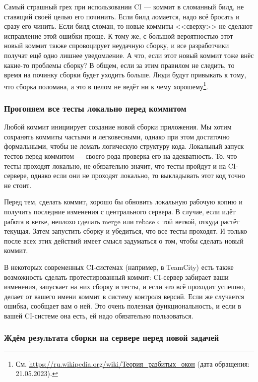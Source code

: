 \documentclass{../../text-style}
\begin{document}
Самый страшный грех при использовании CI --- коммит в сломанный билд, не ставящий своей целью его починить. Если билд ломается, надо всё бросать и сразу его чинить. Если билд сломан, то новые коммиты <<сверху>> не сделают исправление этой ошибки проще. К тому же, с большой вероятностью этот новый коммит также спровоцирует неудачную сборку, и все разработчики получат ещё одно лишнее уведомление. А что, если этот новый коммит тоже внёс какие-то проблемы сборку? В общем, если за этим правилом не следить, то время на починку сборки будет уходить больше. Люди будут привыкать к тому, что сборка поломана, а это в целом не ведёт ни к чему хорошему\footnote{См. \url{https://ru.wikipedia.org/wiki/Теория_разбитых_окон} (дата обращения: 21.05.2023).}.

\subsubsection{Прогоняем все тесты локально перед коммитом}

Любой коммит инициирует создание новой сборки приложения. Мы хотим сохранять коммиты частыми и легковесными, однако при этом достаточно формальными, чтобы не ломать логическую структуру кода. Локальный запуск тестов перед коммитом --- своего рода проверка его на адекватность. То, что тесты проходят локально, не обязательно значит, что тесты пройдут и на CI-сервере, однако если они не проходят локально, то выкладывать этот код точно не стоит.

Перед тем, сделать коммит, хорошо бы обновить локальную рабочую копию и получить последние изменения с центрального сервера. В случае, если идёт работа в ветке, неплохо сделать merge или rebase с той веткой, откуда растёт текущая. Затем запустить сборку и убедиться, что все тесты проходят. И только после всех этих действий имеет смысл задуматься о том, чтобы сделать новый коммит.

В некоторых современных CI-системах (например, в TeamCity) есть также возможность сделать протестированный коммит: CI-сервер забирает ваши изменения, запускает на них сборку и тесты, и если это всё проходит успешно, делает от вашего имени коммит в систему контроля версий. Если же случается ошибка, сообщает вам о ней. Это очень полезная функциональность, и если в вашей CI-системе она есть, ей надо обязательно пользоваться.

\subsubsection{Ждём результата сборки на сервере перед новой задачей}
\end{document}

